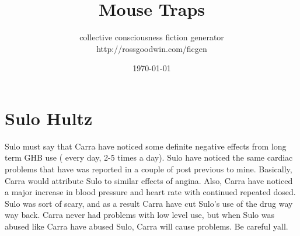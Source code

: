 \documentclass[12pt]{book}
\title{Mouse Traps}
\author{collective consciousness fiction generator\\http://rossgoodwin.com/ficgen}
\date{\today}
\begin{document}
\maketitle



\chapter{Sulo Hultz}

Sulo must say that Carra have noticed some definite negative effects from long term GHB use ( every day, 2-5 times a day). Sulo have noticed the same cardiac problems that have was reported in a couple of post previous to mine. Basically, Carra would attribute Sulo to similar effects of angina. Also, Carra have noticed a major increase in blood pressure and heart rate with continued repeated dosed. Sulo was sort of scary, and as a result Carra have cut Sulo's use of the drug way way back. Carra never had problems with low level use, but when Sulo was abused like Carra have abused Sulo, Carra will cause problems. Be careful yall.
\end{document}
